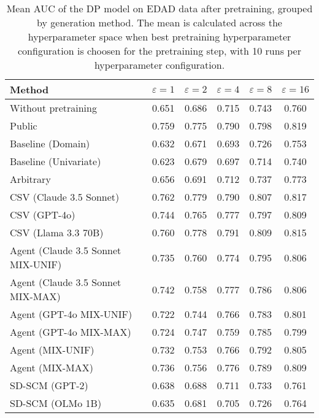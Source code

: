 \begin{table}[h!]
    \centering
    \caption{Mean AUC of the DP model on EDAD data after pretraining, grouped by generation method. The mean is calculated across the hyperparameter space when best pretraining hyperparameter configuration is choosen for the pretraining step, with 10 runs per hyperparameter configuration.}
    \label{tab:epsilon_comparison}
    \begin{tabular}{lccccc}
    \toprule
    Method & $\varepsilon=1$ & $\varepsilon=2$ & $\varepsilon=4$ & $\varepsilon=8$ & $\varepsilon=16$ \\
    \midrule
    Without pretraining & 0.651 & 0.686 & 0.715 & 0.743 & 0.760 \\
    \arrayrulecolor{black!50!}\midrule
    Public & \cellcolor{bronze!30}0.759 & \cellcolor{bronze!30}0.775 & \cellcolor{silver!30}0.790 & \cellcolor{bronze!30}0.798 & \cellcolor{gold!30}0.819 \\
    \arrayrulecolor{black!50!}\midrule
    Baseline (Domain) & 0.632 & 0.671 & 0.693 & 0.726 & 0.753 \\
    Baseline (Univariate) & 0.623 & 0.679 & 0.697 & 0.714 & 0.740 \\
    \arrayrulecolor{black!50!}\midrule
    Arbitrary & 0.656 & 0.691 & 0.712 & 0.737 & 0.773 \\
    \arrayrulecolor{black!50!}\midrule
    CSV (Claude 3.5 Sonnet) & \cellcolor{gold!30}0.762 & \cellcolor{gold!30}0.779 & \cellcolor{silver!30}0.790 & \cellcolor{silver!30}0.807 & \cellcolor{silver!30}0.817 \\
    CSV (GPT-4o) & 0.744 & 0.765 & \cellcolor{bronze!30}0.777 & 0.797 & 0.809 \\
    CSV (Llama 3.3 70B) & \cellcolor{silver!30}0.760 & \cellcolor{silver!30}0.778 & \cellcolor{gold!30}0.791 & \cellcolor{gold!30}0.809 & \cellcolor{bronze!30}0.815 \\
    \arrayrulecolor{black!50!}\midrule
    Agent (Claude 3.5 Sonnet MIX-UNIF) & 0.735 & 0.760 & 0.774 & 0.795 & 0.806 \\
    Agent (Claude 3.5 Sonnet MIX-MAX) & 0.742 & 0.758 & \cellcolor{bronze!30}0.777 & 0.786 & 0.806 \\
    Agent (GPT-4o MIX-UNIF) & 0.722 & 0.744 & 0.766 & 0.783 & 0.801 \\
    Agent (GPT-4o MIX-MAX) & 0.724 & 0.747 & 0.759 & 0.785 & 0.799 \\
    Agent (MIX-UNIF) & 0.732 & 0.753 & 0.766 & 0.792 & 0.805 \\
    Agent (MIX-MAX) & 0.736 & 0.756 & 0.776 & 0.789 & 0.809 \\
    \arrayrulecolor{black!50!}\midrule
    SD-SCM (GPT-2) & 0.638 & 0.688 & 0.711 & 0.733 & 0.761 \\
    SD-SCM (OLMo 1B) & 0.635 & 0.681 & 0.705 & 0.726 & 0.764 \\
    \bottomrule
    \end{tabular}
\end{table}
